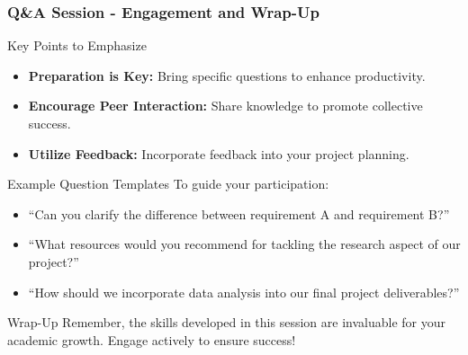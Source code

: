 \documentclass{beamer}
\begin{document}
\begin{frame}[fragile]
    \frametitle{Q\&A Session - Engagement and Wrap-Up}
    \begin{block}{Key Points to Emphasize}
        \begin{itemize}
            \item \textbf{Preparation is Key:} Bring specific questions to enhance productivity.
            \item \textbf{Encourage Peer Interaction:} Share knowledge to promote collective success.
            \item \textbf{Utilize Feedback:} Incorporate feedback into your project planning.
        \end{itemize}
    \end{block}

    \begin{block}{Example Question Templates}
        To guide your participation:
        \begin{itemize}
            \item ``Can you clarify the difference between requirement A and requirement B?''
            \item ``What resources would you recommend for tackling the research aspect of our project?''
            \item ``How should we incorporate data analysis into our final project deliverables?''
        \end{itemize}
    \end{block}

    \begin{block}{Wrap-Up}
        Remember, the skills developed in this session are invaluable for your academic growth. Engage actively to ensure success!
    \end{block}
\end{frame}
\end{document}
